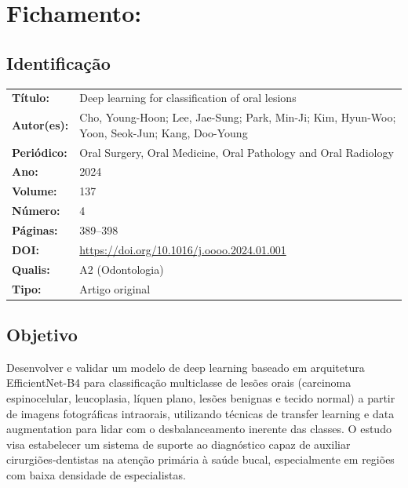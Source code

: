 \section{Fichamento: }

\subsection{Identificação}
\begin{tabular}{ll}
\textbf{Título:} & Deep learning for classification of oral lesions \\
\textbf{Autor(es):} & Cho, Young-Hoon; Lee, Jae-Sung; Park, Min-Ji;
Kim, Hyun-Woo; Yoon, Seok-Jun; Kang, Doo-Young \\
\textbf{Periódico:} & Oral Surgery, Oral Medicine, Oral Pathology and Oral Radiology \\
\textbf{Ano:} & 2024 \\
\textbf{Volume:} & 137 \\
\textbf{Número:} & 4 \\
\textbf{Páginas:} & 389--398 \\
\textbf{DOI:} & \url{https://doi.org/10.1016/j.oooo.2024.01.001} \\
\textbf{Qualis:} & A2 (Odontologia) \\
\textbf{Tipo:} & Artigo original \\
\end{tabular}

\subsection{Objetivo}
Desenvolver e validar um modelo de deep learning baseado em arquitetura
EfficientNet-B4 para classificação multiclasse de lesões orais (carcinoma
espinocelular, leucoplasia, líquen plano, lesões benignas e tecido normal)
a partir de imagens fotográficas intraorais, utilizando técnicas de
transfer learning e data augmentation para lidar com o desbalanceamento
inerente das classes. O estudo visa estabelecer um sistema de suporte ao
diagnóstico capaz de auxiliar cirurgiões-dentistas na atenção primária à
saúde bucal, especialmente em regiões com baixa densidade de
especialistas.

